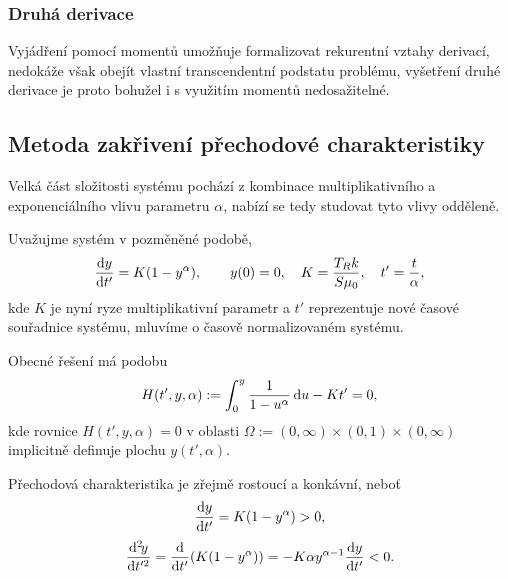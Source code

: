 \subsubsection{Druhá derivace}\label{sss:druha_derivace}
Vyjádření pomocí momentů umožňuje formalizovat rekurentní vztahy derivací, nedokáže však obejít vlastní transcendentní podstatu problému, vyšetření druhé derivace je proto bohužel i s využitím momentů nedosažitelné. 

\subsection{Metoda zakřivení přechodové charakteristiky}\label{ss:metoda_zakriveni_prechodove_charakteristiky}
Velká část složitosti systému pochází z kombinace multiplikativního a exponenciálního vlivu parametru $\alpha$, nabízí se tedy studovat tyto vlivy odděleně.

Uvažujme systém  v pozměněné podobě,
\begin{equation}
    \frac{\mathrm{d} y}{\mathrm{d} t'}=K(1-y^\alpha), \qquad y(0)=0,\quad K=\frac{T_Rk}{S\mu_0},\quad t'=\frac{t}{\alpha},
\end{equation}
kde $K$ je nyní ryze multiplikativní parametr a $t'$ reprezentuje nové časové souřadnice systému, mluvíme o časově normalizovaném systému. 

Obecné řešení má podobu
\begin{equation}
    H(t',y,\alpha):=\int_0^y\frac{1}{1-u^\alpha}\,\mathrm{d}{u}-Kt'=0,
\end{equation}
kde rovnice $H(t',y,\alpha)=0$ v oblasti $\Omega:=(0,\infty)\times(0,1)\times(0,\infty)$ implicitně definuje plochu $y(t',\alpha)$.

Přechodová charakteristika je zřejmě rostoucí a konkávní, neboť
\begin{equation}
    \frac{\mathrm{d} y}{\mathrm{d} t'}=K(1-y^\alpha)>0,
\end{equation}
\begin{equation}
    \frac{\mathrm{d}^2 \! y}{\mathrm{d} t'^2}=\frac{\mathrm{d} }{\mathrm{d} t'}(K(1-y^\alpha))=-K\alpha y^{\alpha-1}\frac{\mathrm{d} y}{\mathrm{d} t'}<0.
\end{equation}

